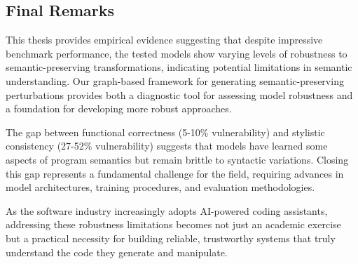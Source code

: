 \documentclass[%
thesis=student,%
coverpage=false,%
titlepage=false,%
headmarks=true, %
english,%
font=libertine, %
math=newpxtx, %
BCOR=5mm,%
coverBCOR=11mm%
]{tum-templates/book/tumbook}
\begin{document}
\subsection{Final Remarks}

This thesis provides empirical evidence suggesting that despite impressive benchmark performance, the tested models show varying levels of robustness to semantic-preserving transformations, indicating potential limitations in semantic understanding. Our graph-based framework for generating semantic-preserving perturbations provides both a diagnostic tool for assessing model robustness and a foundation for developing more robust approaches.

The gap between functional correctness (5-10\% vulnerability) and stylistic consistency (27-52\% vulnerability) suggests that models have learned some aspects of program semantics but remain brittle to syntactic variations. Closing this gap represents a fundamental challenge for the field, requiring advances in model architectures, training procedures, and evaluation methodologies.

As the software industry increasingly adopts AI-powered coding assistants, addressing these robustness limitations becomes not just an academic exercise but a practical necessity for building reliable, trustworthy systems that truly understand the code they generate and manipulate.


\appendix

\backmatter{}

\listoffigures
\listofalgorithms
{}



\printbibliography{} %
\end{document}
